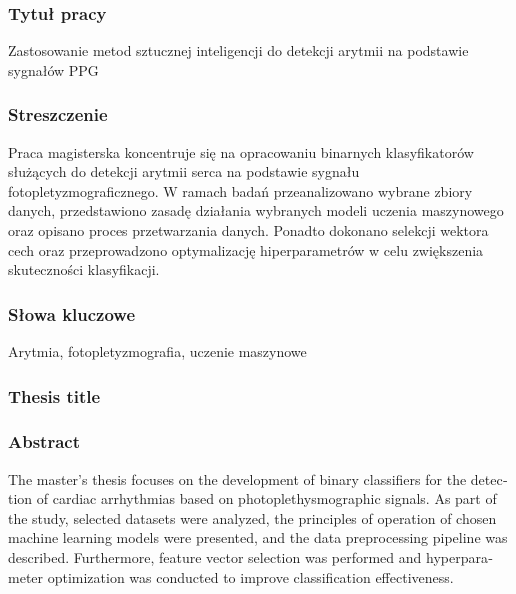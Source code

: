 \documentclass[a4paper,twoside,12pt]{book}
\begin{document}


\cleardoublepage

\rmfamily\normalfont
\pagestyle{empty}




\subsubsection*{Tytuł pracy}
Zastosowanie metod sztucznej inteligencji do detekcji arytmii na podstawie sygnałów PPG

\subsubsection*{Streszczenie}
Praca magisterska koncentruje się na opracowaniu binarnych klasyfikatorów służących do detekcji arytmii serca na podstawie sygnału fotopletyzmograficznego. W ramach badań przeanalizowano wybrane zbiory danych, przedstawiono zasadę działania wybranych modeli uczenia maszynowego oraz opisano proces przetwarzania danych. Ponadto dokonano selekcji wektora cech oraz przeprowadzono optymalizację hiperparametrów w celu zwiększenia skuteczności klasyfikacji.

\subsubsection*{Słowa kluczowe}
Arytmia, fotopletyzmografia, uczenie maszynowe

\subsubsection*{Thesis title}
\begin{otherlanguage}{british}
	\TitleAlt
\end{otherlanguage}

\subsubsection*{Abstract}
\begin{otherlanguage}{british}
	The master's thesis focuses on the development of binary classifiers for the detection of cardiac arrhythmias based on photoplethysmographic signals. As part of the study, selected datasets were analyzed, the principles of operation of chosen machine learning models were presented, and the data preprocessing pipeline was described. Furthermore, feature vector selection was performed and hyperparameter optimization was conducted to improve classification effectiveness.
\end{otherlanguage}
\end{document}
